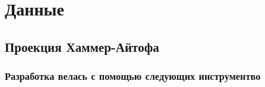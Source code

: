 \documentclass[14pt,aspectratio=43]{beamer}
\begin{document}
\section{Данные}\label{sub:smthzd}
\subsection{Проекция Хаммер-Айтофа}\label{sub:hammer}
\begin{frame}[<alignment>]
\frametitle{Разработка велась с помощью следующих инструментво}

\begin{figure}[H]
\begin{minipage}[h]{0.13\linewidth}
\end{minipage}
\hfill
\begin{minipage}[h]{0.13\linewidth}
\end{minipage}
\hfill
\begin{minipage}[h]{0.23\linewidth}
\end{minipage}
\hfill
\begin{minipage}[h]{0.23\linewidth}
\end{minipage}

\vfill
\begin{minipage}[h]{0.31\linewidth}
\end{minipage}
\hfill
\begin{minipage}[h]{0.31\linewidth}
\end{minipage}
\hfill
\begin{minipage}[h]{0.31\linewidth}
\end{minipage}

\vfill
\begin{minipage}[h]{0.31\linewidth}
\end{minipage}
\hfill
\begin{minipage}[h]{0.31\linewidth}
\end{minipage}
\hfill
\begin{minipage}[h]{0.31\linewidth}
\end{minipage}
\vfill

\begin{minipage}[h]{0.7\linewidth}
\end{minipage}
\end{figure}


\end{frame}	
\end{document}
